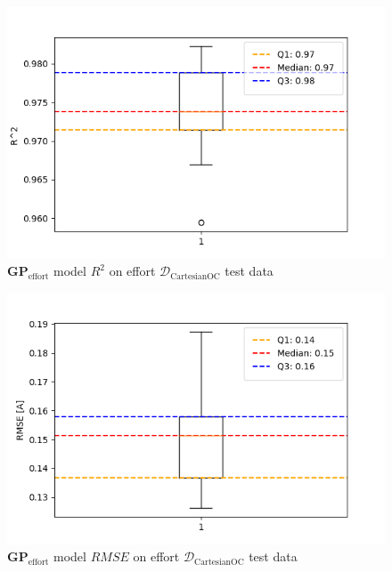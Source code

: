     
    \begin{figure}[H]
    \centering
    \includegraphics[width=1\columnwidth]{Images/05_results/effort_boxplot_test_OC_R^2.png}
    \caption[\(\boldsymbol{GP}_{\text{effort}}\) model \(R^2\) on effort \(\mathcal{D}_{\text{CartesianOC}}\) test data]{\(\boldsymbol{GP}_{\text{effort}}\) model \(R^2\) on effort \(\mathcal{D}_{\text{CartesianOC}}\) test data}
    \label{fig:effort_oc_R^2_test}
    \end{figure}

    \begin{figure}[H]
    \centering
    \includegraphics[width=1\columnwidth]{Images/05_results/effort_boxplot_test_OC_RMSE.png}
    \caption[\(\boldsymbol{GP}_{\text{effort}}\) model \(RMSE\) on effort \(\mathcal{D}_{\text{CartesianOC}}\) test data]{\(\boldsymbol{GP}_{\text{effort}}\) model \(RMSE\) on effort \(\mathcal{D}_{\text{CartesianOC}}\) test data}
    \label{fig:effort_oc_RMSE_test}
    \end{figure}

